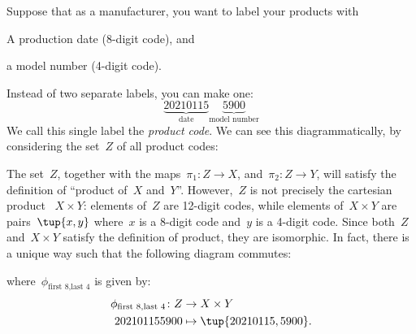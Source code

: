 \begin{example}
Suppose that as a manufacturer, you want to label your products with
\begin{compactitem}
\item A production date (8-digit code), and
\item a model number (4-digit code).
\end{compactitem}
Instead of two separate labels, you can make one:
\begin{equation*}
    \underbrace{20210115}_{\text{date}}\underbrace{5900}_{\text{model number}}
\end{equation*}
We call this single label the \emph{product code}. We can see this diagrammatically, by considering the set~$Z$ of all product codes:
\begin{center}
\end{center}
The set~$Z$, together with the maps~$\pi_1\colon Z\to X$, and~$\pi_2\colon Z\to Y$, will satisfy the definition of ``product of~$X$ and~$Y$''. However,~$Z$ is not precisely the cartesian product~
$X\times Y$: elements of~$Z$ are 12-digit codes, while elements of~$X\times Y$ are pairs~$\tup{x,y}$ where~$x$ is a 8-digit code and~$y$ is a 4-digit code. Since both~$Z$ and~$X\times Y$ satisfy the definition of product, they are isomorphic. In fact, there is a unique way such that the following diagram commutes:
\begin{center}
\end{center}
where~$\phi_{\text{first 8},\text{last 4}}$ is given by:
\begin{equation*}
\begin{aligned}
    \phi_{\text{first 8},\text{last 4}}\colon Z&\to X\times Y\\
    202101155900&\mapsto \tup{20210115,5900}.
\end{aligned}
\end{equation*}
\end{example}


